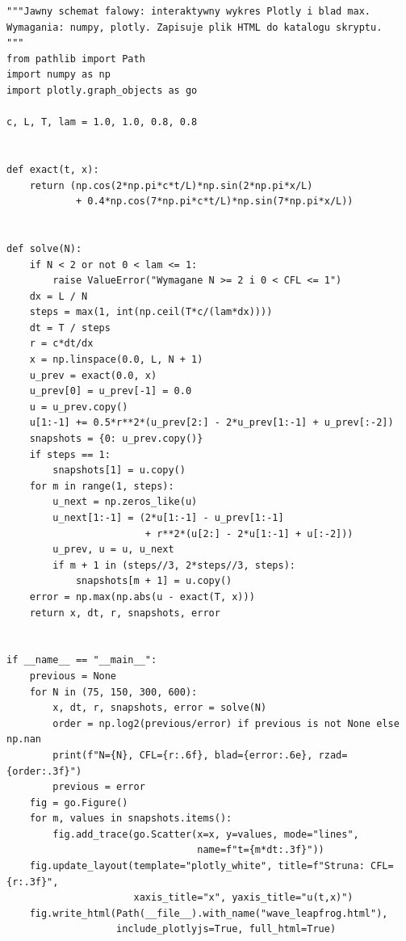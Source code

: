 \begin{lstlisting}[style=pythonpde,caption={Schemat różnicowy równania falowego: Plotly i test błędu},label={code:pde-wave}]
"""Jawny schemat falowy: interaktywny wykres Plotly i blad max.
Wymagania: numpy, plotly. Zapisuje plik HTML do katalogu skryptu.
"""
from pathlib import Path
import numpy as np
import plotly.graph_objects as go

c, L, T, lam = 1.0, 1.0, 0.8, 0.8


def exact(t, x):
    return (np.cos(2*np.pi*c*t/L)*np.sin(2*np.pi*x/L)
            + 0.4*np.cos(7*np.pi*c*t/L)*np.sin(7*np.pi*x/L))


def solve(N):
    if N < 2 or not 0 < lam <= 1:
        raise ValueError("Wymagane N >= 2 i 0 < CFL <= 1")
    dx = L / N
    steps = max(1, int(np.ceil(T*c/(lam*dx))))
    dt = T / steps
    r = c*dt/dx
    x = np.linspace(0.0, L, N + 1)
    u_prev = exact(0.0, x)
    u_prev[0] = u_prev[-1] = 0.0
    u = u_prev.copy()
    u[1:-1] += 0.5*r**2*(u_prev[2:] - 2*u_prev[1:-1] + u_prev[:-2])
    snapshots = {0: u_prev.copy()}
    if steps == 1:
        snapshots[1] = u.copy()
    for m in range(1, steps):
        u_next = np.zeros_like(u)
        u_next[1:-1] = (2*u[1:-1] - u_prev[1:-1]
                        + r**2*(u[2:] - 2*u[1:-1] + u[:-2]))
        u_prev, u = u, u_next
        if m + 1 in (steps//3, 2*steps//3, steps):
            snapshots[m + 1] = u.copy()
    error = np.max(np.abs(u - exact(T, x)))
    return x, dt, r, snapshots, error


if __name__ == "__main__":
    previous = None
    for N in (75, 150, 300, 600):
        x, dt, r, snapshots, error = solve(N)
        order = np.log2(previous/error) if previous is not None else np.nan
        print(f"N={N}, CFL={r:.6f}, blad={error:.6e}, rzad={order:.3f}")
        previous = error
    fig = go.Figure()
    for m, values in snapshots.items():
        fig.add_trace(go.Scatter(x=x, y=values, mode="lines",
                                 name=f"t={m*dt:.3f}"))
    fig.update_layout(template="plotly_white", title=f"Struna: CFL={r:.3f}",
                      xaxis_title="x", yaxis_title="u(t,x)")
    fig.write_html(Path(__file__).with_name("wave_leapfrog.html"),
                   include_plotlyjs=True, full_html=True)
\end{lstlisting}

